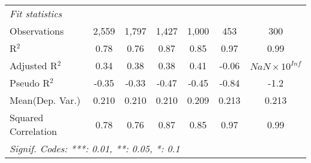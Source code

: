 \begin{tabular}{lcccccc}
   \midrule
   \emph{Fit statistics}\\
   Observations                                               & 2,559        & 1,797        & 1,427        & 1,000   & 453            & 300\\  
   R$^2$                                                      & 0.78         & 0.76         & 0.87         & 0.85    & 0.97           & 0.99\\  
   Adjusted R$^2$                                             & 0.34         & 0.38         & 0.38         & 0.41    & -0.06          & $NaN\times 10^{Inf}$\\   
   Pseudo R$^2$                                               & -0.35        & -0.33        & -0.47        & -0.45   & -0.84          & -1.2\\  
Mean(Dep. Var.) & 0.210 & 0.210 & 0.210 & 0.209 & 0.213 & 0.213 \\
   Squared Correlation                                        & 0.78         & 0.76         & 0.87         & 0.85    & 0.97           & 0.99\\  
   \midrule \midrule
   \multicolumn{7}{l}{\emph{Signif. Codes: ***: 0.01, **: 0.05, *: 0.1}}\\
\end{tabular}
\par\endgroup
